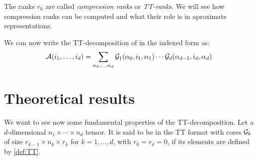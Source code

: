 The ranks $r_k$ are called \emph{compression ranks} or \emph{TT-ranks}. We will see how compression ranks can be computed and what their role is in aproximate representations.

We can now write the TT-decomposition of \A in the indexed form as:
\begin{equation} \label{def:TTindex}
  \mathcal{A}(i_1,\dots,i_d) = \sum_{\alpha_0,\dots,\alpha_d} \mathcal{G}_1(\alpha_0,i_1,\alpha_1) \cdots \mathcal{G}_d(\alpha_{d-1},i_d,\alpha_d)
\end{equation}

\section{Theoretical results}
We want to see now some fundamental properties of the TT-decomposition. Let \A a $d$-dimensional $n_1 \times \cdots \times n_d$ tensor. It is said to be in the TT format with cores $\mathcal{G}_k$ of size $r_{k-1} \times n_k \times r_k$ for $k=1,\ldots ,d$, with $r_0 = r_d = 0$, if its elements are defined by \ref{def:TT}.

